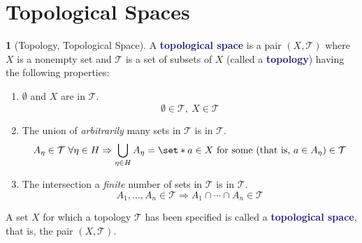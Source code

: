 \documentclass[12pt]{article}
\newcommand{\navy}[1]{\textcolor{MidnightBlue}{\bf #1}}
\theoremstyle{plain}
\theoremstyle{definition}
\newtheorem{definition}{\color{MidnightBlue}{\textbf{Definition}}}[section]
\def\Set{\set*}%
\def\imp{\Rightarrow}
\newcommand{\1}{\mathbbm 1}
\newcommand{\tT}{\mathcal T}
\begin{document}
\section{Topological Spaces}

\begin{definition}[Topology, Topological Space]
	A \navy{topological space} is a pair $(X,\tT)$ where $X$ is a nonempty set and $\tT$ is a set of subsets of $X$ (called a \navy{topology}) having the following properties:
	\begin{enumerate}
		\item $\emptyset$ and $X$ are in $\tT$.
		\begin{equation}
			\emptyset \in \tT,\ X \in \tT
		\end{equation}
		\item The union of \textit{arbitrarily} many sets in $\tT$ is in $\tT$.
		\begin{equation}
			A_\eta \in \tT \ \forall \eta \in H \imp \bigcup_{\eta \in H} A_\eta = \Set{a \in X \text{ for some (that is, } a \in A_\eta \text{)}} \in \tT
		\end{equation}
		\item The intersection a \textit{finite} number of sets in $\tT$ is in $\tT$.
		\begin{equation}
			A_1, \ldots, A_n \in \tT \imp A_1 \cap \cdots \cap A_n \in \tT
		\end{equation}
	\end{enumerate}
	A set $X$ for which a topology $\tT$ has been specified is called a \navy{topological space}, that is, the pair $(X,\tT)$.
\end{definition}
\end{document}
